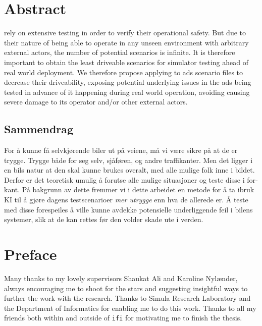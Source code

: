 \chapter*{Abstract}

 rely on extensive testing in order to verify their operational safety. But due to
their nature of being able to operate in any unseen environment with arbitrary external actors,
the number of potential scenarios is infinite. It is therefore important to obtain the least
driveable scenarios for simulator testing ahead of real world deployment. We therefore propose
applying  to \acrlong{ads} scenario files to decrease their driveability, exposing
potential underlying issues in the \acrshort{ads} being tested in advance of it happening during
real world operation, avoiding causing severe damage to its operator and/or other external actors.


\begin{otherlanguage}{norsk}
    \section*{Sammendrag}
    For å kunne få selvkjørende biler ut på veiene, må vi være sikre på at de er trygge. Trygge både
    for seg selv, sjåføren, og andre traffikanter. Men det ligger i en bils natur at den skal kunne
    brukes overalt, med alle mulige folk inne i bildet. Derfor er det teoretisk umulig å forutse
    alle mulige situasjoner og teste disse i forkant. På bakgrunn av dette fremmer vi i dette
    arbeidet en metode for å ta ibruk KI til å gjøre dagens testscenarioer \textit{mer utrygge} enn
    hva de allerede er. Å teste med disse forespeiles å ville kunne avdekke potensielle
    underliggende feil i bilens systemer, slik at de kan rettes før den volder skade ute i verden.
\end{otherlanguage}

\chapter*{Preface}

Many thanks to my lovely supervisors Shaukat Ali and Karoline Nylænder, always encouraging me to
shoot for the stars and suggesting insightful ways to further the work with the research. Thanks to
Simula Research Laboratory and the Department of Informatics for enabling me to do this work. Thanks
to all my friends both within and outside of \texttt{ifi} for motivating me to finish the thesis.

